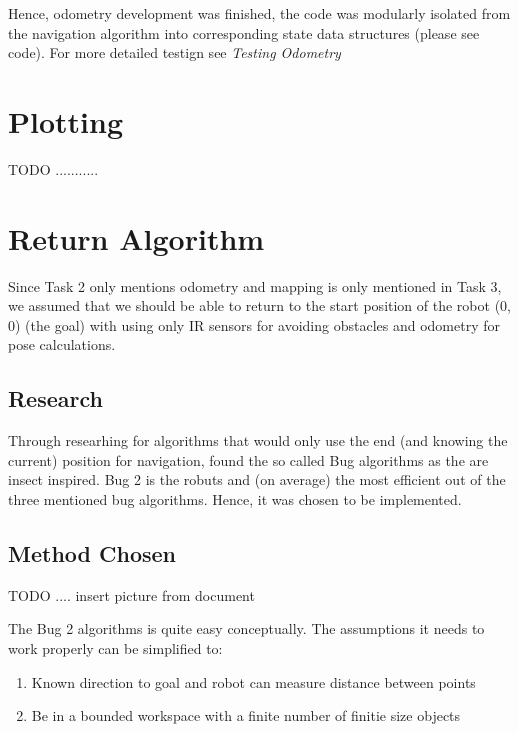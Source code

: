 \documentclass[11pt, a4paper]{article}
\begin{document}
Hence, odometry development was finished, the code was modularly isolated from the navigation algorithm 
into corresponding state data structures (please see code). For more detailed testign see \textit{Testing Odometry}



\section{Plotting}

TODO ...........


\section{Return Algorithm}

Since Task 2 only mentions odometry and mapping is only mentioned in Task 3, we assumed that we should
be able to return to the start position of the robot ($0$,$0$) (the goal) with using only IR sensors for avoiding obstacles
and odometry for pose calculations. 

\subsection{Research}

Through researhing for algorithms that would only use the end (and knowing the current) position for navigation, 
found the so called Bug algorithms as the are insect inspired. Bug 2 is the robuts and 
(on average) the most efficient out of the three mentioned bug algorithms. 
Hence, it was chosen to be implemented.


\subsection{Method Chosen}

TODO .... insert picture from document


The Bug 2 algorithms is quite easy conceptually. The assumptions it needs to work properly can be simplified to:

\begin{enumerate}

	\item Known direction to goal and robot can measure distance between points
	\item Be in a bounded workspace with a finite number of finitie size objects

\end{enumerate}
\end{document}
